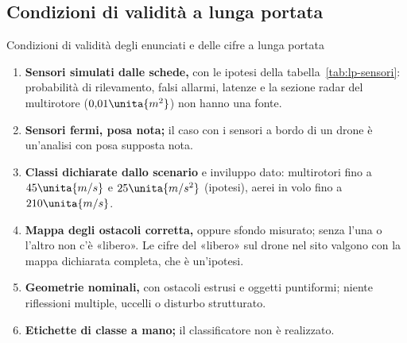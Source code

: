 \subsection{Condizioni di validità a lunga portata}\label{sec:lp-validita}

\begin{riquadro}{Condizioni di validità degli enunciati e delle cifre a lunga portata}
\begin{enumerate}[label=\arabic*.,itemsep=1pt]
\item \textbf{Sensori simulati dalle schede,} con le ipotesi della tabella~\ref{tab:lp-sensori}: probabilità di rilevamento, falsi allarmi, latenze e la sezione radar del multirotore ($0{,}01\unita{m^2}$) non hanno una fonte.
\item \textbf{Sensori fermi, posa nota;} il caso con i sensori a bordo di un drone è un'analisi con posa supposta nota.
\item \textbf{Classi dichiarate dallo scenario} e inviluppo dato: multirotori fino a $45\unita{m/s}$ e $25\unita{m/s^2}$ (ipotesi), aerei in volo fino a $210\unita{m/s}$.
\item \textbf{Mappa degli ostacoli corretta,} oppure sfondo misurato; senza l'una o l'altro non c'è «libero». Le cifre del «libero» sul drone nel sito valgono con la mappa dichiarata completa, che è un'ipotesi.
\item \textbf{Geometrie nominali,} con ostacoli estrusi e oggetti puntiformi; niente riflessioni multiple, uccelli o disturbo strutturato.
\item \textbf{Etichette di classe a mano;} il classificatore non è realizzato.
\end{enumerate}
\end{riquadro}

